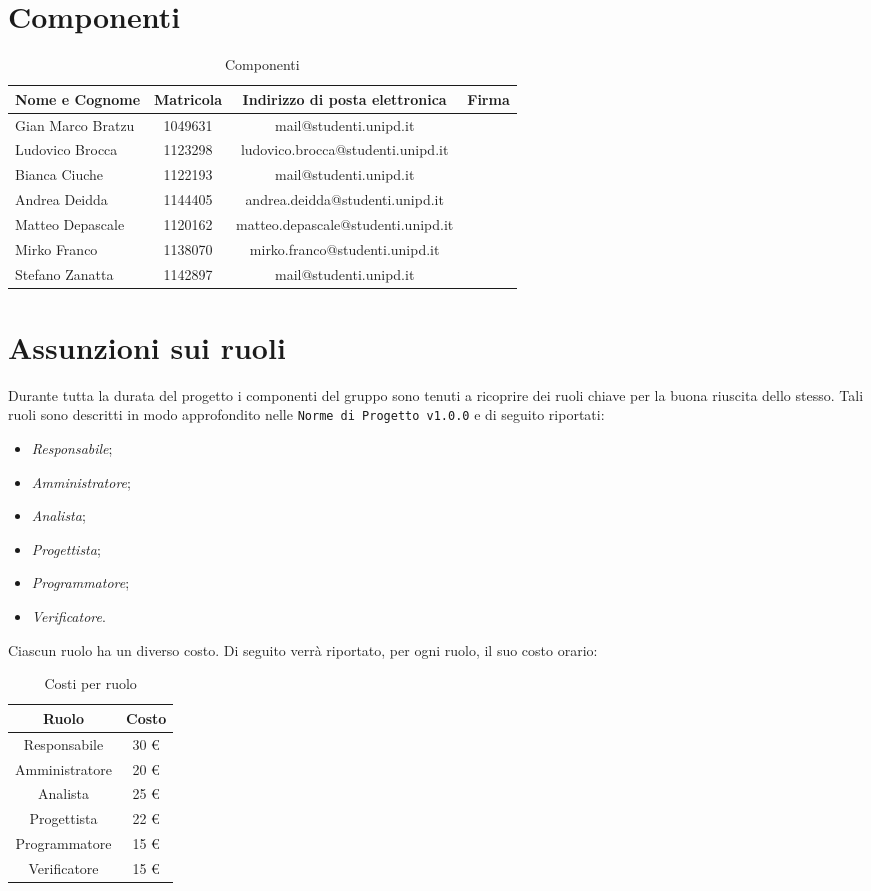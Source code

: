 \section{Componenti}
	\begin{table}[htp]
		\centering
		\caption{Componenti}
		\begin{tabularx}{\textwidth}{|X|c|c|X|}
			\hline
			\textbf{Nome e Cognome} & \textbf{Matricola} & \textbf{Indirizzo di posta elettronica} & \textbf{Firma} \\
			\hline 
			Gian Marco Bratzu & 1049631 & mail@studenti.unipd.it & \\
			\hline
			Ludovico Brocca & 1123298 & ludovico.brocca@studenti.unipd.it & \\
			\hline
			Bianca Ciuche & 1122193 & mail@studenti.unipd.it & \\
			\hline
			Andrea Deidda & 1144405 & andrea.deidda@studenti.unipd.it & \\
			\hline
			Matteo Depascale & 1120162 & matteo.depascale@studenti.unipd.it & \\
			\hline
			Mirko Franco & 1138070 &  mirko.franco@studenti.unipd.it & \\
			\hline
			Stefano Zanatta & 1142897 & mail@studenti.unipd.it & \\
			\hline
		\end{tabularx}
	\end{table}
\section{Assunzioni sui ruoli}
	Durante tutta la durata del progetto i componenti del gruppo sono tenuti a ricoprire dei ruoli chiave per la buona riuscita dello stesso.
	Tali ruoli sono descritti in modo approfondito nelle \texttt{Norme di Progetto v1.0.0} e di seguito riportati:
	\begin{itemize}
		\item \textit{Responsabile};
		\item \textit{Amministratore};
		\item \textit{Analista};
		\item \textit{Progettista};
		\item \textit{Programmatore};
		\item \textit{Verificatore}.
	\end{itemize}
	Ciascun ruolo ha un diverso costo. Di seguito verrà riportato, per ogni ruolo, il suo costo orario:
	\begin{table}[htp]
		\centering
		\caption{Costi per ruolo}
		\begin{tabular}{|c|c|}
			\hline
			\textbf{Ruolo} & \textbf{Costo} \\
			\hline
			Responsabile & 30 \euro \\
			Amministratore & 20 \euro \\
			Analista & 25 \euro \\
			Progettista & 22 \euro \\
			Programmatore & 15 \euro \\
			Verificatore & 15 \euro \\
			\hline
		\end{tabular}
	\end{table}